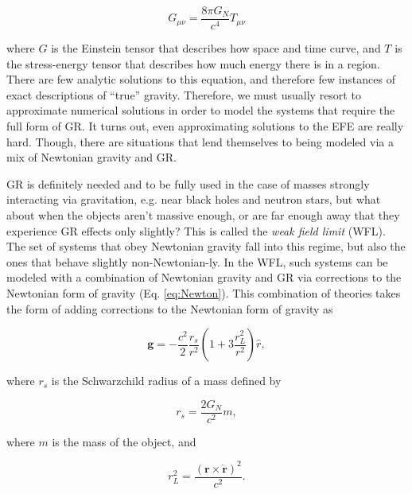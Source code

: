 \documentclass{report}
\begin{document}
            \begin{equation} \label{eq:EFE}
                G_{\mu \nu} = \frac{8 \pi G_N}{c^4} T_{\mu \nu}
            \end{equation}
            
            where $G$ is the Einstein tensor that describes how space and time curve, and $T$ is the stress-energy tensor that describes how much energy there is in a region.  There are few analytic solutions to this equation, and therefore few instances of exact descriptions of ``true'' gravity.  Therefore, we must usually resort to approximate numerical solutions in order to model the systems that require the full form of GR.  It turns out, even approximating solutions to the EFE are really hard.  Though, there are situations that lend themselves to being modeled via a mix of Newtonian gravity and GR.
            
            GR is definitely needed and to be fully used in the case of masses strongly interacting via gravitation, e.g. near black holes and neutron stars, but what about when the objects aren't massive enough, or are far enough away that they experience GR effects only slightly?  This is called the \emph{weak field limit} (WFL).  The set of systems that obey Newtonian gravity fall into this regime, but also the ones that behave slightly non-Newtonian-ly.  In the WFL, such systems can be modeled with a combination of Newtonian gravity and GR via corrections to the Newtonian form of gravity (Eq. \ref{eq:Newton}).  This combination of theories takes the form of adding corrections to the Newtonian form of gravity as
            
            \begin{equation} \label{eq:MOND}
                \mathbf{g} = -\frac{c^2}{2} \frac{r_s}{r^2} \left( 1 + 3 \frac{r_L^2}{r^2} \right) \hat{r},
            \end{equation}
            
            where $r_s$ is the Schwarzchild radius of a mass defined by 
            
            \begin{equation} \label{eq:Schwarz}
                r_s = \frac{2 G_N}{c^2} m,
            \end{equation}
            
            where $m$ is the mass of the object, and
            
            \begin{equation}
                r_L^2 = \frac{( \mathbf{r} \times \dot{\mathbf{r}} )^2}{c^2}.
            \end{equation}
\end{document}
